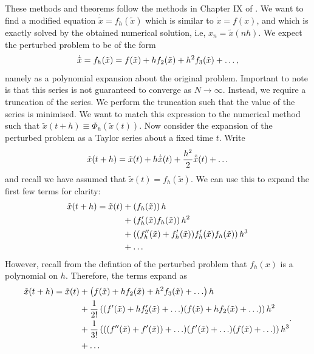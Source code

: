 These methods and theorems follow the methods in Chapter IX of \cite{gni2006}.
We want to find a modified equation $\dot{\tilde{x}} = f_h (\tilde{x})$ which is similar to $\dot{x} = f(x)$,
and which is exactly solved by the obtained numerical solution, i.e, $x_n = \tilde{x}(nh)$.
We expect the perturbed problem to be of the form
\begin{equation*}
	\dot{\tilde{x}} = f_h(\tilde{x}) = f(\tilde{x}) + h f_2(\tilde{x}) + h^2 f_3(\tilde{x}) + \mathellipsis,
\end{equation*}
namely as a polynomial expansion about the original problem. Important to note is that this series is not guaranteed to converge as $N \rightarrow \infty$.
Instead, we require a truncation of the series.
We perform the truncation such that the value of the series is minimised.
We want to match this expression to the numerical method such that $\tilde{x}(t+h) \equiv \Phi_h(\tilde{x}(t))$.
Now consider the expansion of the perturbed problem as a Taylor series about a fixed time $t$. Write
\begin{equation*}
	\tilde{x}(t+h) = \tilde{x}(t) + h \dot{\tilde{x}}(t) + \frac{h^2}{2} \ddot{\tilde{x}}(t) + \mathellipsis
\end{equation*}
and recall we have assumed that $\tilde{x}(t) = f_h(\tilde{x})$.
We can use this to expand the first few terms for clarity:
\begin{equation*}
	\begin{aligned}
		\tilde{x}(t+h) = \tilde{x}(t) &+ \left(
			f_h(\tilde{x})
		\right)h \\
		&+ \left(
			f'_h(\tilde{x})f_h(\tilde{x})
		\right)h^2 \\
		&+ \left(
			(f''_h(\tilde{x})+f'_h(\tilde{x}))f'_h(\tilde{x})f_h(\tilde{x})
		\right)h^3 \\
		&+ \mathellipsis
	\end{aligned}
\end{equation*}
However, recall from the defintion of the perturbed problem that $f_h(x)$ is a polynomial on $h$.
Therefore, the terms expand as
\begin{equation*}
	\begin{aligned}
		\tilde{x}(t+h) = \tilde{x}(t) &+ \left(
			f(\tilde{x}) + h f_2(\tilde{x}) + h^2 f_3(\tilde{x}) + \mathellipsis
 		\right)h \\
		&+ \frac{1}{2!}\left(
			(f'(\tilde{x}) + h f'_2(\tilde{x})  + \mathellipsis)
			(f(\tilde{x}) + h f_2(\tilde{x}) + \mathellipsis)
		\right)h^2 \\
		&+ \frac{1}{3!}\left(
			((f''(\tilde{x}) + f'(\tilde{x})) + \mathellipsis)
			(f'(\tilde{x}) + \mathellipsis)
			(f(\tilde{x}) + \mathellipsis)
		\right)h^3 \\
		&+ \mathellipsis
	\end{aligned}.
\end{equation*}

